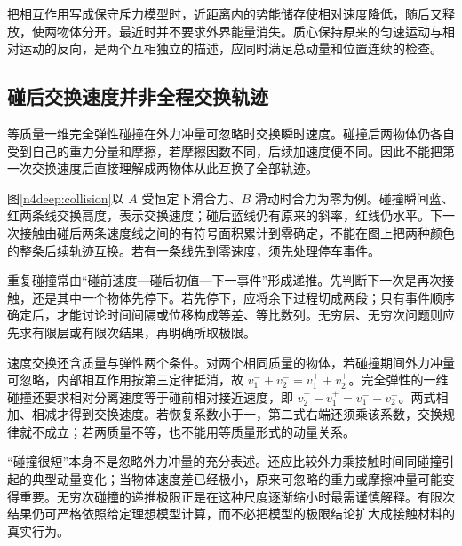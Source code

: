 把相互作用写成保守斥力模型时，近距离内的势能储存使相对速度降低，随后又释放，使两物体分开。最近时并不要求外界能量消失。质心保持原来的匀速运动与相对运动的反向，是两个互相独立的描述，应同时满足总动量和位置连续的检查。



\subsection{碰后交换速度并非全程交换轨迹}
等质量一维完全弹性碰撞在外力冲量可忽略时交换瞬时速度。碰撞后两物体仍各自受到自己的重力分量和摩擦，若摩擦因数不同，后续加速度便不同。因此不能把第一次交换速度后直接理解成两物体从此互换了全部轨迹。

图\ref{n4deep:collision}以 $A$ 受恒定下滑合力、$B$ 滑动时合力为零为例。碰撞瞬间蓝、红两条线交换高度，表示交换速度；碰后蓝线仍有原来的斜率，红线仍水平。下一次接触由碰后两条速度线之间的有符号面积累计到零确定，不能在图上把两种颜色的整条后续轨迹互换。若有一条线先到零速度，须先处理停车事件。

重复碰撞常由“碰前速度—碰后初值—下一事件”形成递推。先判断下一次是再次接触，还是其中一个物体先停下。若先停下，应将余下过程切成两段；只有事件顺序确定后，才能讨论时间间隔或位移构成等差、等比数列。无穷层、无穷次问题则应先求有限层或有限次结果，再明确所取极限。

速度交换还含质量与弹性两个条件。对两个相同质量的物体，若碰撞期间外力冲量可忽略，内部相互作用按第三定律抵消，故 $v_1^-+v_2^-=v_1^++v_2^+$。完全弹性的一维碰撞还要求相对分离速度等于碰前相对接近速度，即 $v_2^+-v_1^+=v_1^--v_2^-$。两式相加、相减才得到交换速度。若恢复系数小于一，第二式右端还须乘该系数，交换规律就不成立；若两质量不等，也不能用等质量形式的动量关系。

“碰撞很短”本身不是忽略外力冲量的充分表述。还应比较外力乘接触时间同碰撞引起的典型动量变化；当物体速度差已经极小，原来可忽略的重力或摩擦冲量可能变得重要。无穷次碰撞的递推极限正是在这种尺度逐渐缩小时最需谨慎解释。有限次结果仍可严格依照给定理想模型计算，而不必把模型的极限结论扩大成接触材料的真实行为。

